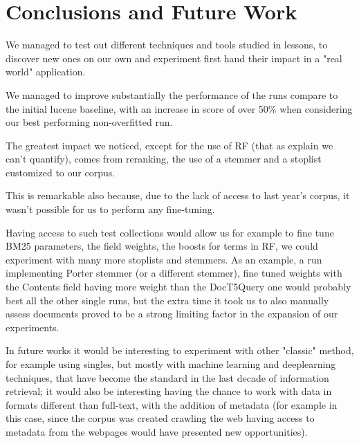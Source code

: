 \section{Conclusions and Future Work}
\label{sec:conclusion}

We managed to test out different techniques and tools studied in lessons, to discover new ones on our own and experiment first hand their impact in a "real world" application.

We managed to improve substantially the performance of the runs compare to the initial lucene baseline, with an increase in score of over 50\% when considering our best performing non-overfitted run.

The greatest impact we noticed, except for the use of RF (that as explain we can't quantify), comes from reranking, the use of a stemmer and a stoplist customized to our corpus.

This is remarkable also because, due to the lack of access to last year's corpus, it wasn't possible for us to perform any fine-tuning.

Having access to such test collections would allow us for example to fine tune BM25 parameters, the field weights, the boosts for terms in RF, we could experiment with many more stoplists and stemmers.
As an example, a run implementing Porter stemmer (or a different stemmer), fine tuned weights with the Contents field having more weight than the DocT5Query one would probably best all the other single runs, but the extra time it took us to also manually assess documents proved to be a strong limiting factor in the expansion of our experiments.

In future works it would be interesting to experiment with other "classic" method, for example using singles, but mostly with machine learning and deeplearning techniques, that have become the standard in the last decade of information retrieval; it would also be interesting having the chance to work with data in formats different than full-text, with the addition of metadata (for example in this case, since the corpus was created crawling the web having access to metadata from the webpages would have presented new opportunities).